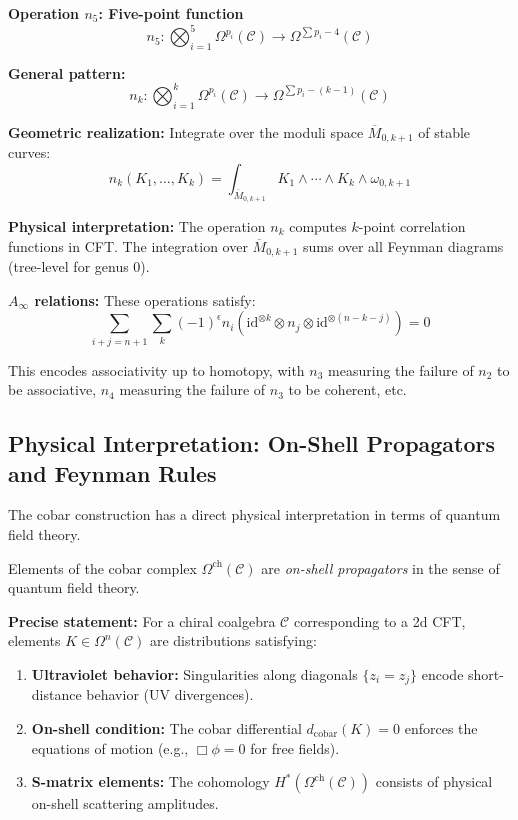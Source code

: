 \begin{example}
\textbf{Operation $n_5$: Five-point function}
$$n_5: \bigotimes_{i=1}^5 \Omega^{p_i}(\mathcal{C}) \to \Omega^{\sum p_i - 4}(\mathcal{C})$$

\textbf{General pattern:}
$$n_k: \bigotimes_{i=1}^k \Omega^{p_i}(\mathcal{C}) \to \Omega^{\sum p_i - (k-1)}(\mathcal{C})$$

\textbf{Geometric realization:} Integrate over the moduli space $\overline{M}_{0,k+1}$ 
of stable curves:
$$n_k(K_1, \ldots, K_k) = \int_{\overline{M}_{0,k+1}} K_1 \wedge \cdots \wedge K_k 
\wedge \omega_{0,k+1}$$

\textbf{Physical interpretation:} The operation $n_k$ computes $k$-point correlation 
functions in CFT. The integration over $\overline{M}_{0,k+1}$ sums over all Feynman 
diagrams (tree-level for genus 0).

\textbf{$A_\infty$ relations:} These operations satisfy:
$$\sum_{i+j=n+1} \sum_{k} (-1)^{\epsilon} n_i(\text{id}^{\otimes k} \otimes n_j 
\otimes \text{id}^{\otimes (n-k-j)}) = 0$$

This encodes associativity up to homotopy, with $n_3$ measuring the failure of 
$n_2$ to be associative, $n_4$ measuring the failure of $n_3$ to be coherent, etc.
\end{example}

\subsection{Physical Interpretation: On-Shell Propagators and Feynman Rules}

The cobar construction has a direct physical interpretation in terms of quantum 
field theory.

\begin{theorem}[Cobar Elements = On-Shell Propagators]\label{thm:cobar-physical}
Elements of the cobar complex $\Omega^{\text{ch}}(\mathcal{C})$ are \emph{on-shell 
propagators} in the sense of quantum field theory.

\textbf{Precise statement:} For a chiral coalgebra $\mathcal{C}$ corresponding 
to a 2d CFT, elements $K \in \Omega^n(\mathcal{C})$ are distributions satisfying:
\begin{enumerate}
\item \textbf{Ultraviolet behavior:} Singularities along diagonals $\{z_i = z_j\}$ 
encode short-distance behavior (UV divergences).
\item \textbf{On-shell condition:} The cobar differential $d_{\text{cobar}}(K) = 0$ 
enforces the equations of motion (e.g., $\Box \phi = 0$ for free fields).
\item \textbf{S-matrix elements:} The cohomology $H^*(\Omega^{\text{ch}}(\mathcal{C}))$ 
consists of physical on-shell scattering amplitudes.
\end{enumerate}
\end{theorem}

